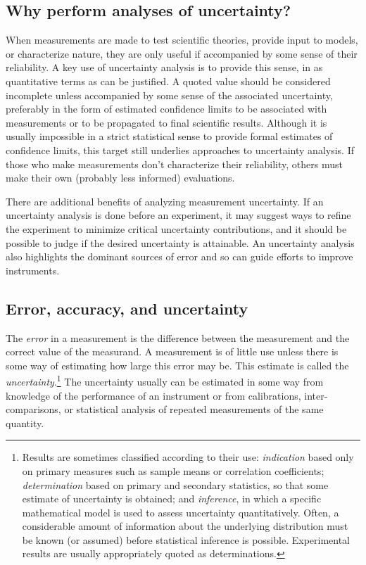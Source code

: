 \documentclass[12pt,twoside,english]{article}\usepackage[]{graphicx}\usepackage[]{color}
\begin{document}
\subsection{Why perform analyses of uncertainty?}

When measurements are made to test scientific theories, provide input to models, or characterize nature, they are only useful if accompanied by some sense of their reliability. A key use of uncertainty analysis is to provide this sense, in as quantitative terms as can be justified. A quoted value should be considered incomplete unless accompanied by some sense of the associated uncertainty, preferably in the form of estimated confidence limits to be associated with measurements or to be propagated to final scientific results. Although it is usually impossible in a strict statistical sense to provide formal estimates of confidence limits, this target still underlies approaches to uncertainty analysis. If those who make measurements don't characterize their reliability, others must make their own (probably less informed) evaluations. 

There are additional benefits of analyzing measurement uncertainty. If an uncertainty analysis is done before an experiment, it may suggest ways to refine the experiment to minimize critical uncertainty contributions, and it should be possible to judge if the desired uncertainty is attainable. An uncertainty analysis also highlights the dominant sources of error and so can guide efforts to improve instruments. 


\subsection{Error, accuracy, and uncertainty}

The \emph{error} in a measurement is the difference between the measurement and the correct value of the measurand. A measurement is of little use unless there is some way of estimating how large this error may be. This estimate is called the \emph{uncertainty}.\footnote{Results are sometimes classified according to their use: \textit{indication} based only on primary measures such as sample means or correlation coefficients; \textit{determination} based on primary and secondary statistics, so that some estimate of uncertainty is obtained; and 
\textit{inference}, in which a specific mathematical model is used to assess uncertainty quantitatively. Often, a considerable amount of information about the underlying distribution must be known (or assumed) before statistical inference is possible. Experimental results are usually appropriately quoted as determinations.} The uncertainty usually can be estimated in some way from knowledge of the performance of an instrument or from calibrations, inter-comparisons, or statistical analysis of repeated measurements of the same quantity. 
\end{document}
